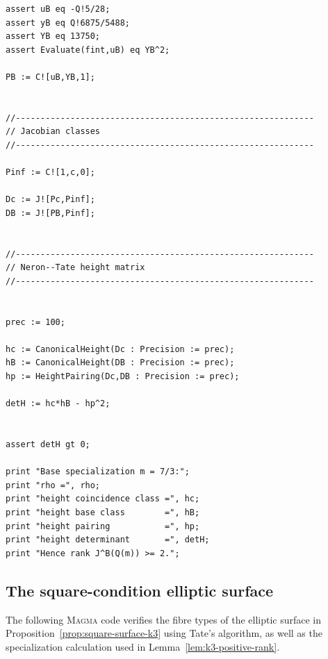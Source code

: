 \documentclass[11pt]{amsart}
\theoremstyle{plain}
\theoremstyle{remark}
\theoremstyle{plain}
\begin{document}
\begin{verbatim}
assert uB eq -Q!5/28;
assert yB eq Q!6875/5488;
assert YB eq 13750;
assert Evaluate(fint,uB) eq YB^2;

PB := C![uB,YB,1];


//------------------------------------------------------------
// Jacobian classes
//------------------------------------------------------------

Pinf := C![1,c,0];

Dc := J![Pc,Pinf];
DB := J![PB,Pinf];


//------------------------------------------------------------
// Neron--Tate height matrix
//------------------------------------------------------------


prec := 100;

hc := CanonicalHeight(Dc : Precision := prec);
hB := CanonicalHeight(DB : Precision := prec);
hp := HeightPairing(Dc,DB : Precision := prec);

detH := hc*hB - hp^2;


assert detH gt 0;

print "Base specialization m = 7/3:";
print "rho =", rho;
print "height coincidence class =", hc;
print "height base class        =", hB;
print "height pairing           =", hp;
print "height determinant       =", detH;
print "Hence rank J^B(Q(m)) >= 2.";

\end{verbatim}

\subsection{The square-condition elliptic surface}
\label{app:square-condition}

The following \textsc{Magma} code verifies the fibre types of the
elliptic surface in Proposition~\ref{prop:square-surface-k3} using
Tate's algorithm, as well as the specialization calculation used in
Lemma~\ref{lem:k3-positive-rank}.
\end{document}
